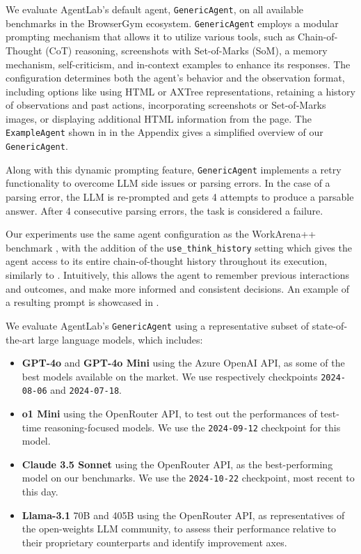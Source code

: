 \documentclass[10pt]{article} %
\newcommand{\code}[1]{\texttt{#1}}
\newcommand{\qcap}[1]{\textbf{\textcolor{teal}{[QC: #1]}}}
\begin{document}
We evaluate AgentLab's default agent, \code{GenericAgent}, on all available benchmarks in the BrowserGym ecosystem. \code{GenericAgent} employs a modular prompting mechanism that allows it to utilize various tools, such as Chain-of-Thought (CoT) reasoning, screenshots with Set-of-Marks (SoM), a memory mechanism, self-criticism, and in-context examples to enhance its responses. The configuration determines both the agent's behavior and the observation format, including options like using HTML or AXTree representations, retaining a history of observations and past actions, incorporating screenshots or Set-of-Marks images, or displaying additional HTML information from the page.
The \code{ExampleAgent} shown in  in the Appendix gives a simplified overview of our \code{GenericAgent}. %

Along with this dynamic prompting feature, \code{GenericAgent} implements a retry functionality to overcome LLM side issues or parsing errors. In the case of a parsing error, the LLM is re-prompted and gets 4 attempts to produce a parsable answer. After 4 consecutive parsing errors, the task is considered a failure.

Our experiments use the same agent configuration as the WorkArena++ benchmark \citep{workarena-plus-plus}, with the addition of the \code{use_think_history} setting which gives the agent access to its entire chain-of-thought history throughout its execution, similarly to \citet{agent-q}. Intuitively, this allows the agent to remember previous interactions and outcomes, and make more informed and consistent decisions. An example of a resulting prompt is showcased in .

We evaluate AgentLab's \code{GenericAgent} using a representative subset of state-of-the-art large language models, which includes:
\begin{itemize}
    \item \textbf{GPT-4o} and \textbf{GPT-4o Mini} \citep{gpt-4} using the Azure OpenAI API, as some of the best models available on the market. We use respectively checkpoints \code{2024-08-06} and \code{2024-07-18}.
    \item \textbf{o1 Mini} \citep{o1-mini} using the OpenRouter API, to test out the performances of test-time reasoning-focused models. We use the \code{2024-09-12} checkpoint for this model.
    \item \textbf{Claude 3.5 Sonnet} \citep{claude} using the OpenRouter API, as the best-performing model on our benchmarks. We use the \code{2024-10-22} checkpoint, most recent to this day.
    \item \textbf{Llama-3.1} 70B and 405B \citep{llama3} using the OpenRouter API, as representatives of the open-weights LLM community, to assess their performance relative to their proprietary counterparts and identify improvement axes.
\end{itemize}
\end{document}
